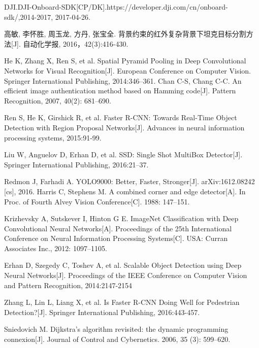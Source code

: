 \clearpage{}
\thispagestyle{fancy}
\thispagestyle{fancy}
% 
\thispagestyle{fancy}


\begin{thebibliography}{00}
\thispagestyle{fancy}
     DJI.DJI-Onboard-SDK[CP/DK].https://developer.dji.com/cn/onboard-sdk/,2014-2017, 2017-04-26.

     高敏, 李怀胜, 周玉龙, 方丹, 张宝全. 背景约束的红外复杂背景下坦克目标分割方法[J]. 自动化学报, 2016，42(3):416-430.

     He K, Zhang X, Ren S, et al. Spatial Pyramid Pooling in Deep Convolutional Networks for Visual Recognition[J]. European Conference on Computer Vision. Springer International Publishing, 2014:346–361.
     Chan C-S, Chang C-C. An efficient image authentication method based on Hamming code[J]. Pattern Recognition, 2007, 40(2): 681–690.

     Ren S, He K, Girshick R, et al. Faster R-CNN: Towards Real-Time Object Detection with Region Proposal Networks[J]. Advances in neural information processing systems, 2015:91-99.

     Liu W, Anguelov D, Erhan D, et al. SSD: Single Shot MultiBox Detector[J]. Springer International Publishing, 2016:21–37.

     Redmon J, Farhadi A. YOLO9000: Better, Faster, Stronger[J]. arXiv:1612.08242 [cs], 2016.
     Harris C, Stephens M. A combined corner and edge detector[A]. In Proc. of Fourth Alvey Vision Conference[C]. 1988: 147–151.

     Krizhevsky A, Sutskever I, Hinton G E. ImageNet Classification with Deep Convolutional Neural Networks[A]. Proceedings of the 25th International Conference on Neural Information Processing Systems[C]. USA: Curran Associates Inc., 2012: 1097–1105.

     Erhan D, Szegedy C, Toshev A, et al. Scalable Object Detection using Deep Neural Networks[J]. Proceedings of the IEEE Conference on Computer Vision and Pattern Recognition, 2014:2147-2154

     Zhang L, Lin L, Liang X, et al. Is Faster R-CNN Doing Well for Pedestrian Detection?[J]. Springer International Publishing, 2016:443-457.

     Sniedovich M. Dijkstra's algorithm revisited: the dynamic programming connexion[J]. Journal of Control and Cybernetics. 2006, 35 (3): 599–620.


\end{thebibliography}
